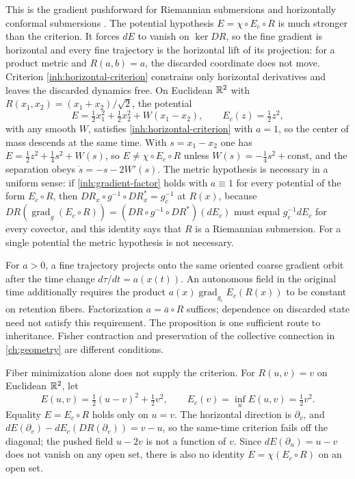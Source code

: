 This is the gradient pushforward for Riemannian submersions
\citep{ONeill1966} and horizontally conformal submersions
\citep{BairdWood2003}. The potential hypothesis $E=\chi\circ E_c\circ R$ is
much stronger than the criterion. It forces $dE$ to vanish on $\ker DR$, so
the fine gradient is horizontal and every fine trajectory is the horizontal
lift of its projection: for a product metric and $R(a,b)=a$, the discarded
coordinate does not move. Criterion \cref{inh:horizontal-criterion}
constrains only horizontal derivatives and leaves the discarded dynamics
free. On Euclidean $\mathbb R^2$ with $R(x_1,x_2)=(x_1+x_2)/\sqrt2$, the potential
\begin{equation}
 E=\tfrac12x_1^2+\tfrac12x_2^2+W(x_1-x_2),
 \qquad E_c(z)=\tfrac12z^2,
\end{equation}
with any smooth $W$, satisfies \cref{inh:horizontal-criterion} with $a=1$,
so the center of mass descends at the same time. With $s=x_1-x_2$ one has
$E=\tfrac12z^2+\tfrac14s^2+W(s)$, so $E\neq\chi\circ E_c\circ R$ unless
$W(s)=-\tfrac14s^2+\mathrm{const}$, and the separation obeys
$\dot s=-s-2W'(s)$. The metric hypothesis is necessary in a
uniform sense: if \cref{inh:gradient-factor} holds with $a\equiv1$ for every
potential of the form $E_c\circ R$, then
$DR_x\circ g^{-1}\circ DR_x^{*}=g_c^{-1}$ at $R(x)$, because
$DR(\operatorname{grad}_g(E_c\circ R))=(DR\circ g^{-1}\circ DR^{*})(dE_c)$ must equal
$g_c^{-1}dE_c$ for every covector, and this identity says that $R$ is a
Riemannian submersion. For a single potential the metric hypothesis is not
necessary.

For $a>0$, a fine trajectory projects onto the same oriented coarse
gradient orbit after the time change $d\tau/dt=a(x(t))$. An autonomous
field in the original time additionally requires the product
$a(x)\operatorname{grad}_{g_c}E_c(R(x))$ to be constant on retention
fibers. Factorization $a=\bar a\circ R$ suffices; dependence on discarded
state need not satisfy this requirement. The proposition is one sufficient
route to inheritance. Fisher contraction and preservation of the
collective connection in \cref{ch:geometry} are different conditions.

Fiber minimization alone does not supply the criterion.
For $R(u,v)=v$ on Euclidean $\mathbb R^2$, let
\begin{equation}
 E(u,v)=\tfrac12(u-v)^2+\tfrac12v^2,
 \qquad E_c(v)=\inf_u E(u,v)=\tfrac12v^2.
\end{equation}
Equality $E=E_c\circ R$ holds only on $u=v$. The horizontal direction is
$\partial_v$, and $dE(\partial_v)-dE_c(DR(\partial_v))=v-u$, so the
same-time criterion fails off the diagonal; the pushed field $u-2v$ is not a
function of $v$. Since $dE(\partial_u)=u-v$ does not vanish on any open set,
there is also no identity $E=\chi(E_c\circ R)$ on an open set.

